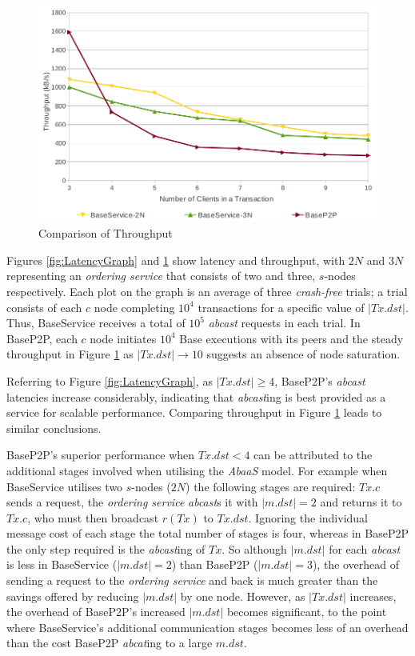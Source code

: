 \begin{figure}[htbp!]
 \includegraphics[width=\textwidth,height=\textheight,keepaspectratio]{throughput}
 \caption{Comparison of Throughput}
 \label{fig:ThroughputGraph}
\end{figure}

Figures \ref{fig:LatencyGraph} and \ref{fig:ThroughputGraph} show latency and throughput, with $2N$ and $3N$ representing an \emph{ordering service} that consists of two and three, $s$-nodes respectively.  Each plot on the graph is an average of three \emph{crash-free} trials; a trial consists of each $c$ node completing $10^4$ transactions for a specific value of $|Tx.dst|$. Thus, BaseService receives a total of $10^5$ \emph{abcast} requests in each trial. In BaseP2P, each $c$ node initiates $10^4$ Base executions with its peers and the steady throughput in Figure \ref{fig:ThroughputGraph} as $|Tx.dst| \rightarrow 10$ suggests an absence of node saturation.

Referring to Figure \ref{fig:LatencyGraph}, as $|Tx.dst| \geq 4$, BaseP2P's \emph{abcast} latencies increase considerably, indicating that \emph{abcast}ing is best provided as a service for scalable performance. Comparing throughput in Figure \ref{fig:ThroughputGraph} leads to similar conclusions.  

BaseP2P's superior performance when $Tx.dst < 4$ can be attributed to the additional stages involved when utilising the \emph{AbaaS} model.  For example when BaseService utilises two $s$-nodes ($2N$) the following stages are required: $Tx.c$ sends a request, the \emph{ordering service} \emph{abcast}s it with $|m.dst| = 2$ and returns it to $Tx.c$, who must then broadcast $r(Tx)$ to $Tx.dst$.  Ignoring the individual message cost of each stage the total number of stages is four, whereas in BaseP2P the only step required is the \emph{abcast}ing of $Tx$.  So although $|m.dst|$ for each \emph{abcast} is less in BaseService ($|m.dst| = 2$) than BaseP2P ($|m.dst| = 3$), the overhead of sending a request to the \emph{ordering service} and back is much greater than the savings offered by reducing $|m.dst|$ by one node.  However, as $|Tx.dst|$ increases, the overhead of BaseP2P's increased $|m.dst|$ becomes significant, to the point where BaseService's additional communication stages becomes less of an overhead than the cost BaseP2P \emph{abcat}ing to a large $m.dst$.  

